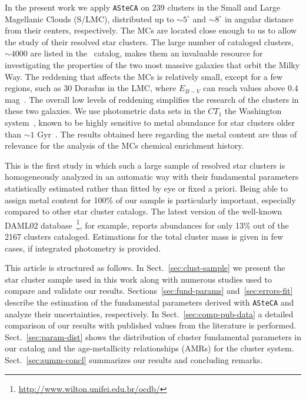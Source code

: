 \documentclass{aa}
\begin{document}
In the present work we apply \texttt{ASteCA} on 239 clusters in the Small and
Large Magellanic Clouds (S/LMC), distributed up to ${\sim}5^{\circ}$ and $
{\sim}8^{\circ}$ in angular distance from their centers, respectively.
%
The MCs are located close enough to us to allow the study of their resolved star
clusters. The large number of cataloged clusters, $\sim4000$ are listed in
the~\cite{Bica_2008} catalog, makes them an invaluable resource for
investigating the properties of the two most massive galaxies that orbit the
Milky Way.
%
The reddening that affects the MCs is relatively small, except for a few regions,
such as 30 Doradus in the LMC, where $E_{B-V}$ can reach values above $0.4$
mag~\citep{Piatti_2015b}. The overall low levels of reddening simplifies
the research of the clusters in these two galaxies.
%
We use photometric data sets in the $CT_1$ the Washington
system~\citep{Canterna_1976,Geisler_1996}, known to be highly sensitive
to metal abundance for star clusters older than ${\sim}1$
Gyr~\citep{Geisler_1999}.
The results obtained here regarding the metal content are thus of relevance for
the analysis of the MCs chemical enrichment history.

This is the first study in which such a large sample of resolved star clusters is
homogeneously analyzed in an automatic way with their fundamental
parameters statistically estimated rather than fitted by eye or fixed a priori.
%
Being able to assign metal content for 100\% of our sample is
particularly important, especially compared to other star cluster catalogs. The
latest version of the well-known DAML02 database~\citep[v3.5, 2016 Jan 28;][]
{Dias_2002}\footnote{\url{http://www.wilton.unifei.edu.br/ocdb/}},
for example, reports abundances for only 13\% out of the 2167
clusters cataloged. Estimations for the total cluster mass is given in few
cases, if integrated photometry is provided.

This article is structured as follows.
In Sect.~\ref{sec:clust-sample} we present the star cluster sample used in
this work along with numerous studies used to compare and validate our
results.
Sections~\ref{sec:fund-params} and~\ref{sec:errors-fit} describe the estimation
of the fundamental parameters derived with \texttt{ASteCA} and analyze their
uncertainties, respectively.
In Sect.~\ref{sec:comp-pub-data} a detailed comparison of our results with
published values from the literature is performed.
Sect.~\ref{sec:param-dist} shows the distribution of cluster fundamental
parameters in our catalog and the age-metallicity relationships (AMRs) for the
cluster system.
Sect.~\ref{sec:summ-concl} summarizes our results and concluding remarks.
\end{document}
